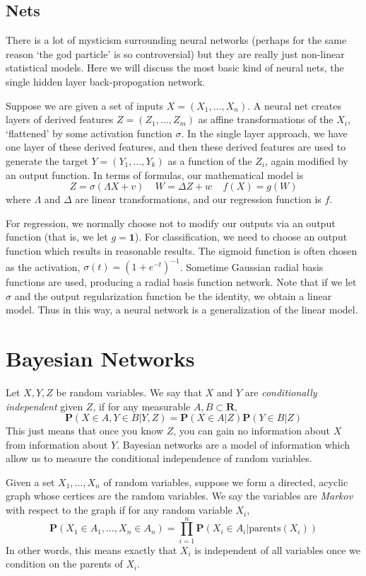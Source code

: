 \section{Nets}

There is a lot of mysticism surrounding neural networks (perhaps for the same reason `the god particle' is so controversial) but they are really just non-linear statistical models. Here we will discuss the most basic kind of neural nets, the single hidden layer back-propogation network.

Suppose we are given a set of inputs $X = (X_1, \dots, X_n)$. A neural net creates layers of derived features $Z = (Z_1, \dots, Z_m)$ as affine transformations of the $X_i$, `flattened' by some activation function $\sigma$. In the single layer approach, we have one layer of these derived features, and then these derived features are used to generate the target $Y = (Y_1, \dots, Y_k)$ as a function of the $Z_i$, again modified by an output function. In terms of formulas, our mathematical model is
%
\[ Z = \sigma(\Lambda X + v)\ \ \ \ \ W = \Delta Z + w\ \ \ \ \ f(X) = g(W) \]
%
where $\Lambda$ and $\Delta$ are linear transformations, and our regression function is $f$.

For regression, we normally choose not to modify our outputs via an output function (that is, we let $g = \mathbf{1}$). For classification, we need to choose an output function which results in reasonable results. The sigmoid function is often chosen as the activation, $\sigma(t) = (1 + e^{-t})^{-1}$. Sometime Gaussian radial basis functions are used, producing a radial basis function network. Note that if we let $\sigma$ and the output regularization function be the identity, we obtain a linear model. Thus in this way, a neural network is a generalization of the linear model.

\chapter{Bayesian Networks}

Let $X,Y,Z$ be random variables. We say that $X$ and $Y$ are \emph{conditionally independent} given $Z$, if for any measurable $A,B \subset \mathbf{R}$,
%
\[ \mathbf{P}(X \in A,Y \in B|Y,Z) = \mathbf{P}(X \in A|Z)\mathbf{P}(Y \in B|Z) \]
%
This just means that once you know $Z$, you can gain no information about $X$ from information about $Y$. Bayesian networks are a model of information which allow us to measure the conditional independence of random variables.

Given a set $X_1, \dots, X_n$ of random variables, suppose we form a directed, acyclic graph whose certices are the random variables. We say the variables are \emph{Markov} with respect to the graph if for any random variable $X_i$,
%
\[ \mathbf{P}(X_1 \in A_1, \dots, X_n \in A_n) = \prod_{i = 1}^n \mathbf{P}(X_i \in A_i | \text{parents}(X_i)) \]
%
In other words, this means exactly that $X_i$ is independent of all variables once we condition on the parents of $X_i$.

